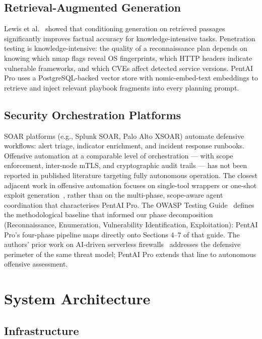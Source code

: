\documentclass[conference]{IEEEtran}
\begin{document}
\subsection{Retrieval-Augmented Generation}

Lewis et al.~\cite{lewis2020} showed that conditioning generation on
retrieved passages significantly improves factual accuracy for knowledge-intensive
tasks. Penetration testing is knowledge-intensive: the quality of a
reconnaissance plan depends on knowing which nmap flags reveal OS fingerprints,
which HTTP headers indicate vulnerable frameworks, and which CVEs affect
detected service versions. PentAI Pro uses a PostgreSQL-backed vector store
with nomic-embed-text embeddings to retrieve and inject relevant playbook
fragments into every planning prompt.

\subsection{Security Orchestration Platforms}

SOAR platforms (e.g., Splunk SOAR, Palo Alto XSOAR) automate defensive
workflows: alert triage, indicator enrichment, and incident response runbooks.
Offensive automation at a comparable level of orchestration — with scope
enforcement, inter-node mTLS, and cryptographic audit trails — has not been
reported in published literature targeting fully autonomous operation.
The closest adjacent work in offensive automation focuses on single-tool
wrappers or one-shot exploit generation~\cite{andriesse2018},
rather than on the multi-phase, scope-aware agent coordination that
characterises PentAI Pro.
The OWASP Testing Guide~\cite{owasp} defines the methodological baseline
that informed our phase decomposition (Reconnaissance, Enumeration,
Vulnerability Identification, Exploitation): PentAI Pro's four-phase
pipeline maps directly onto Sections 4--7 of that guide.
The authors' prior work on AI-driven serverless firewalls~\cite{chowdhury2025serverless}
addresses the defensive perimeter of the same threat model; PentAI Pro
extends that line to autonomous offensive assessment.

\section{System Architecture}

\subsection{Infrastructure}
\end{document}
